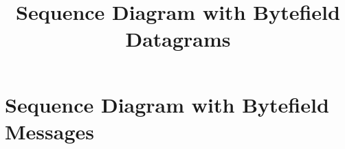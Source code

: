 \documentclass{article}
\begin{document}
\title{Sequence Diagram with Bytefield Datagrams}
\author{}
\date{}
\maketitle

\section*{Sequence Diagram with Bytefield Messages}

\begin{minipage}{0.5\textwidth}
    \begin{sequencediagram}




    \end{sequencediagram}
\end{minipage}%
\end{document}
